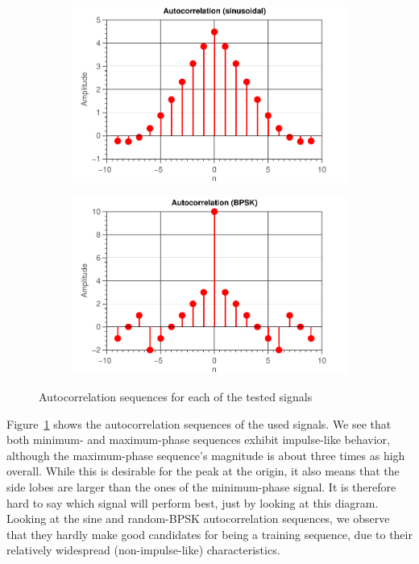 \documentclass[11pt,titlepage]{report}
\begin{document}
\begin{figure}[H]
\begin{subfigure}{0.49\textwidth}
	\end{subfigure}
	\begin{subfigure}{0.49\textwidth}
		\includegraphics[width=\textwidth]{resource/ass-1-report-8-sinusoidal-sinusoidal.pdf}
	\end{subfigure}
	\begin{subfigure}{0.49\textwidth}
		\includegraphics[width=\textwidth]{resource/ass-1-report-8-BPSK-BPSK.pdf}
	\end{subfigure}
	\caption{Autocorrelation sequences for each of the tested signals}
	\label{fig:rep8-autocor}
\end{figure}

Figure~\ref{fig:rep8-autocor} shows the autocorrelation sequences of the used signals. We see that both minimum- and maximum-phase sequences exhibit impulse-like behavior, although the maximum-phase sequence's magnitude is about three times as high overall. While this is desirable for the peak at the origin, it also means that the side lobes are larger than the ones of the minimum-phase signal. It is therefore hard to say which signal will perform best, just by looking at this diagram. Looking at the sine and random-BPSK autocorrelation sequences, we observe that they hardly make good candidates for being a training sequence, due to their relatively widespread (non-impulse-like) characteristics.
\end{document}
